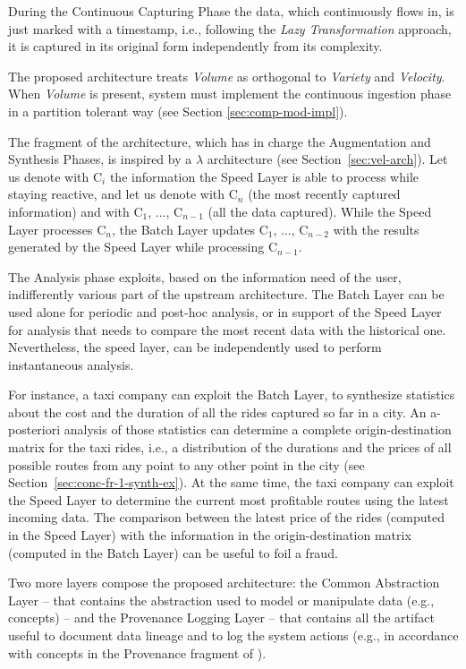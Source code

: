 During the Continuous Capturing Phase the data, which continuously flows in, is just marked with a timestamp, i.e., following the \textit{Lazy Transformation} approach, it is captured in its original form independently from its complexity.  

The proposed architecture treats \textit{Volume} as orthogonal to \textit{Variety} and \textit{Velocity}. When \textit{Volume} is present, system must implement the continuous ingestion phase in a partition tolerant way (see Section \ref{sec:comp-mod-impl}). 

The fragment of the architecture, which has in charge the Augmentation and Synthesis Phases, is inspired by a $\lambda$ architecture (see Section~\ref{sec:vel-arch}). 
Let us denote with C$_i$ the information the Speed Layer is able to process while staying reactive, and let us denote with C$_n$ (the most recently captured information) and with C$_1$, ..., C$_{n-1}$ (all the data captured). While the Speed Layer processes C$_n$, the Batch Layer updates C$_1$, ..., C$_{n-2}$ with the results generated by the Speed Layer while processing C$_{n-1}$.

The Analysis phase exploits, based on the information need of the user, indifferently various part of the upstream architecture. The Batch Layer can be used alone for periodic and post-hoc analysis, or in support of the Speed Layer for analysis that needs to compare the most recent data with the historical one. Nevertheless, the speed layer, can be independently used to perform instantaneous analysis.

For instance, a taxi company can exploit the Batch Layer, to synthesize statistics about the cost and the duration of all the rides captured so far in a city. An a-posteriori analysis of those statistics can determine a complete origin-destination matrix for the taxi rides, i.e., a distribution of the durations and the prices of all possible routes from any point to any other point in the city (see Section~\ref{sec:conc-fr-1-synth-ex}). At the same time, the taxi company can exploit the Speed Layer to determine the current most profitable routes using the latest incoming data. The comparison between the latest price of the rides (computed in the Speed Layer) with the information in the origin-destination matrix (computed in the Batch Layer) can be useful to foil a fraud.  

Two more layers compose the proposed architecture: the Common Abstraction Layer -- that contains the abstraction used to model or manipulate data (e.g., \frappe{} concepts) -- and the Provenance Logging Layer -- that contains all the artifact useful to document data lineage and to log the system actions (e.g., in accordance with concepts in the Provenance fragment of \frappe{}).

